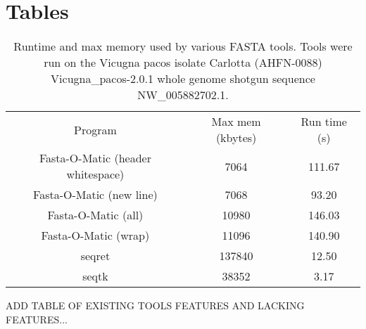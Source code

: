 \section*{Tables}
\begin{table} 
    \begin{tabular}{ c c c }
        Program & Max mem (kbytes) & Run time (s) \\ 
        Fasta-O-Matic (header whitespace) & 7064 & 111.67 \\ 
        Fasta-O-Matic (new line) & 7068 & 93.20 \\ 
        Fasta-O-Matic (all) & 10980 & 146.03 \\ 
        Fasta-O-Matic (wrap) & 11096 & 140.90 \\ 
        seqret & 137840 & 12.50 \\ 
        seqtk & 38352 & 3.17 \\ 
    \end{tabular} 
    \caption{Runtime and max memory used by various FASTA tools. Tools were run on the Vicugna pacos isolate Carlotta (AHFN-0088) Vicugna_pacos-2.0.1 whole genome shotgun sequence NW_005882702.1.} 
\end{table}

ADD TABLE OF EXISTING TOOLS FEATURES AND LACKING FEATURES...

  
  
  
  